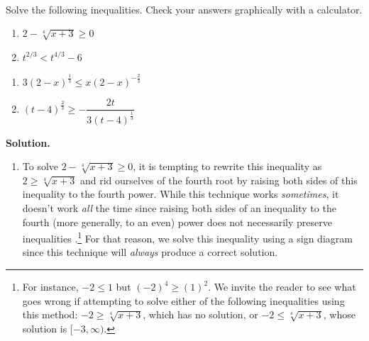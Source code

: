 \begin{ex} \label{powerineqex} $~$

Solve the following inequalities.  Check your answers graphically with a calculator.

\begin{multicols}{2}
\begin{enumerate}

\item $2-\sqrt[4]{x+3} \geq 0$

\item $t^{2/3} < t^{4/3} - 6$


\setcounter{HW}{\value{enumi}}

\end{enumerate}
\end{multicols}

\begin{multicols}{2}
\begin{enumerate}

\setcounter{enumi}{\value{HW}}

\item  \label{third} $3 (2-x)^{\frac{1}{3}} \leq x (2-x)^{-\frac{2}{3}}$

\item \label{fourth} $(t-4)^{\frac{2}{3}} \geq -\dfrac{2t}{3(t-4)^{\frac{1}{3}}}$  


\end{enumerate}
\end{multicols}


{\bf Solution.}  

\begin{enumerate}

\item  To solve $2-\sqrt[4]{x+3} \geq 0$, it is tempting to rewrite this inequality as $2 \geq \sqrt[4]{x+3}$ and rid ourselves of the fourth root by raising both sides of this inequality to the fourth power.  While this technique works \textit{sometimes}, it doesn't work \textit{all} the time since raising both sides of an inequality to the fourth (more generally, to an even) power does not necessarily preserve inequalities .\footnote{For instance, $-2 \leq 1$ but $(-2)^{4} \geq (1)^2$.  We invite the reader to see what goes wrong if attempting to solve either of the following inequalities using this method: $-2 \geq \sqrt[4]{x+3}$, which has no solution, or  $-2 \leq \sqrt[4]{x+3}$, whose solution is $[-3,\infty)$.}  For that reason, we solve this inequality using a sign diagram since this technique will \textit{always} produce a correct solution.    


\end{enumerate}
\end{ex}
